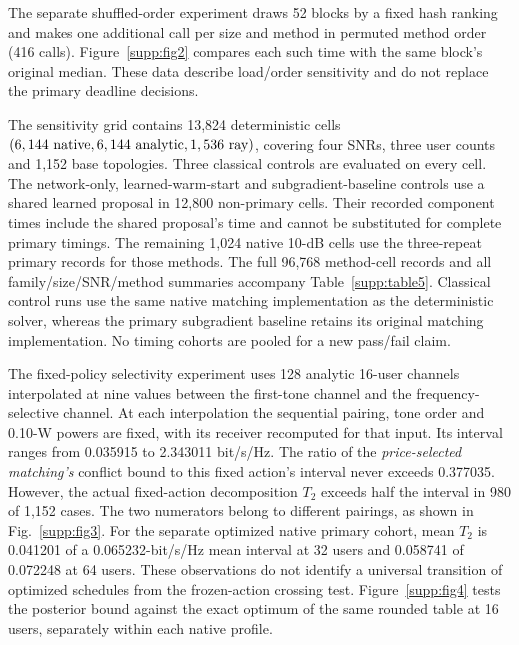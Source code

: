 \documentclass[10pt,letterpaper]{article}
\begin{document}
The separate shuffled-order experiment draws 52 blocks by a fixed hash
ranking and makes one additional call per size and method in permuted
method order (416 calls). Figure~\ref{supp:fig2} compares each such time
with the same block's original median. These data describe load/order
sensitivity and do not replace the primary deadline decisions.

The sensitivity grid contains 13,824 deterministic cells
\((6,144\ {\rm native},6,144\ {\rm analytic},1,536\ {\rm ray})\),
covering four SNRs, three user counts and 1,152 base topologies.
Three classical controls are evaluated on every cell.
The network-only, learned-warm-start and subgradient-baseline controls use a shared learned
proposal in 12,800 non-primary cells. Their recorded component times include
the shared proposal's time and cannot be substituted for complete primary
timings. The remaining 1,024 native 10-dB cells use the three-repeat
primary records for those methods. The full 96,768 method-cell records
and all family/size/SNR/method summaries accompany
Table~\ref{supp:table5}. Classical control runs use the same native
matching implementation as the deterministic solver, whereas the primary
subgradient baseline retains its original matching implementation.
No timing cohorts are pooled for a new pass/fail claim.

The fixed-policy selectivity experiment uses 128 analytic 16-user channels
interpolated at nine values between the first-tone channel and the
frequency-selective channel. At each interpolation the sequential pairing,
tone order and 0.10-W powers are fixed, with its receiver recomputed for
that input. Its interval ranges from 0.035915 to 2.343011 bit/s/Hz.
The ratio of the \emph{price-selected matching's} conflict bound to this
fixed action's interval never exceeds 0.377035.
However, the actual fixed-action decomposition \(T_2\) exceeds half the interval
in 980 of 1,152 cases. The two numerators belong to different pairings,
as shown in Fig.~\ref{supp:fig3}.
For the separate optimized native primary cohort, mean \(T_2\) is
0.041201 of a 0.065232-bit/s/Hz mean interval at 32 users and
0.058741 of 0.072248 at 64 users. These observations do not identify a
universal transition of optimized schedules from the frozen-action
crossing test. Figure~\ref{supp:fig4} tests the posterior bound against
the exact optimum of the same rounded table at 16 users, separately
within each native profile.
\end{document}
